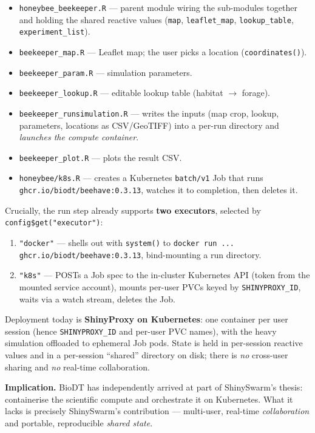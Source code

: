 \documentclass[12pt,a4paper]{article}
\begin{document}
\begin{itemize}[nosep]
  \item \texttt{honeybee\_beekeeper.R} --- parent module wiring the sub-modules
    together and holding the shared reactive values (\texttt{map},
    \texttt{leaflet\_map}, \texttt{lookup\_table}, \texttt{experiment\_list}).
  \item \texttt{beekeeper\_map.R} --- Leaflet map; the user picks a location
    (\texttt{coordinates()}).
  \item \texttt{beekeeper\_param.R} --- simulation parameters.
  \item \texttt{beekeeper\_lookup.R} --- editable lookup table (habitat $\to$
    forage).
  \item \texttt{beekeeper\_runsimulation.R} --- writes the inputs (map crop,
    lookup, parameters, locations as CSV/GeoTIFF) into a per-run directory and
    \emph{launches the compute container}.
  \item \texttt{beekeeper\_plot.R} --- plots the result CSV.
  \item \texttt{honeybee/k8s.R} --- creates a Kubernetes \texttt{batch/v1} Job
    that runs \texttt{ghcr.io/biodt/beehave:0.3.13}, watches it to completion,
    then deletes it.
\end{itemize}

Crucially, the run step already supports \textbf{two executors}, selected by
\texttt{config\$get("executor")}:
\begin{enumerate}[nosep]
  \item \texttt{"docker"} --- shells out with \texttt{system()} to
    \texttt{docker run ... ghcr.io/biodt/beehave:0.3.13}, bind-mounting a run
    directory.
  \item \texttt{"k8s"} --- POSTs a Job spec to the in-cluster Kubernetes API
    (token from the mounted service account), mounts per-user PVCs keyed by
    \texttt{SHINYPROXY\_ID}, waits via a watch stream, deletes the Job.
\end{enumerate}

Deployment today is \textbf{ShinyProxy on Kubernetes}: one container per user
session (hence \texttt{SHINYPROXY\_ID} and per-user PVC names), with the heavy
simulation offloaded to ephemeral Job pods. State is held in per-session reactive
values and in a per-session ``shared'' directory on disk; there is \emph{no}
cross-user sharing and \emph{no} real-time collaboration.

\textbf{Implication.} BioDT has independently arrived at part of ShinySwarm's
thesis: containerise the scientific compute and orchestrate it on Kubernetes.
What it lacks is precisely ShinySwarm's contribution --- multi-user, real-time
\emph{collaboration} and portable, reproducible \emph{shared state}.
\end{document}
